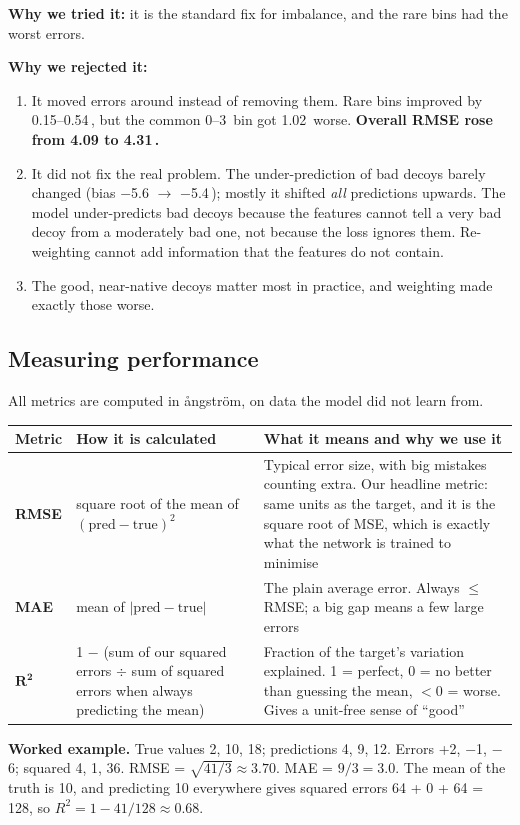 \documentclass[11pt,a4paper]{article}
\newcommand{\A}{\,\text{\AA}}
\begin{document}
\textbf{Why we tried it:} it is the standard fix for imbalance, and the rare bins had the worst errors.

\textbf{Why we rejected it:}
\begin{enumerate}
  \item It moved errors around instead of removing them. Rare bins improved by 0.15--0.54\A, but the common 0--3\A{} bin
        got 1.02\A{} worse. \textbf{Overall RMSE rose from 4.09 to 4.31\A.}
  \item It did not fix the real problem. The under-prediction of bad decoys barely changed (bias $-$5.6 $\to$ $-$5.4\A);
        mostly it shifted \emph{all} predictions upwards. The model under-predicts bad decoys because the features cannot
        tell a very bad decoy from a moderately bad one, not because the loss ignores them. Re-weighting cannot add
        information that the features do not contain.
  \item The good, near-native decoys matter most in practice, and weighting made exactly those worse.
\end{enumerate}

\subsection{Measuring performance}
All metrics are computed in ångström, on data the model did not learn from.

\begin{tabularx}{\linewidth}{@{}lp{4.6cm}Y@{}}
\toprule
Metric & How it is calculated & What it means and why we use it \\
\midrule
\textbf{RMSE} & square root of the mean of $(\text{pred} - \text{true})^2$ & Typical error size, with big mistakes counting extra. Our headline metric: same units as the target, and it is the square root of MSE, which is exactly what the network is trained to minimise \\
\textbf{MAE} & mean of $|\text{pred} - \text{true}|$ & The plain average error. Always $\leq$ RMSE; a big gap means a few large errors \\
$\boldsymbol{R^2}$ & 1 $-$ (sum of our squared errors $\div$ sum of squared errors when always predicting the mean) & Fraction of the target's variation explained. 1 = perfect, 0 = no better than guessing the mean, $<0$ = worse. Gives a unit-free sense of ``good'' \\
\bottomrule
\end{tabularx}

\textbf{Worked example.} True values 2, 10, 18; predictions 4, 9, 12. Errors +2, $-$1, $-$6; squared 4, 1, 36.
RMSE = $\sqrt{41/3} \approx 3.70$. MAE = $9/3 = 3.0$. The mean of the truth is 10, and predicting 10 everywhere gives
squared errors 64 + 0 + 64 = 128, so $R^2 = 1 - 41/128 \approx 0.68$.
\end{document}
